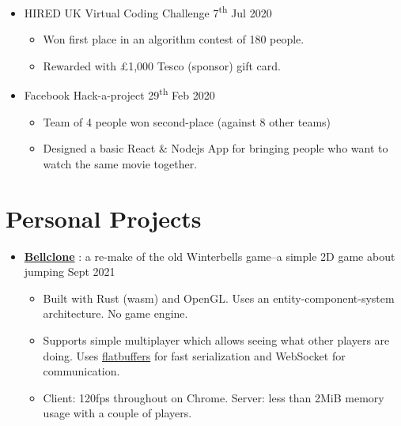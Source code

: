   \begin{itemize}
    \item HIRED \dashdiv{} UK Virtual Coding Challenge \dashdiv{} 7\textsuperscript{th} Jul 2020
    \begin{itemize}
      \item Won first place in an algorithm contest of 180 people.
      \item Rewarded with £1,000 Tesco (sponsor) gift card.
    \end{itemize}
    \item Facebook \dashdiv{} Hack-a-project \dashdiv{} 29\textsuperscript{th} Feb 2020
    \begin{itemize}
      \item Team of 4 people won second-place (against 8 other teams)
      \item Designed a basic React \& Nodejs App  for bringing people who want to watch the same movie together.
    \end{itemize}
  \end{itemize}

  \section{Personal Projects}

  \begin{itemize}

    \item \href{https://bellclone.maowtm.org/}{\color{link}\textbf{Bellclone}} : a re-make of the old Winterbells game--a simple 2D game about jumping \dashdiv{} Sept 2021

    \begin{itemize}
      \item Built with Rust (wasm) and OpenGL. Uses an entity-component-system architecture. No game engine.
      \item Supports simple multiplayer which allows seeing what other players are doing. Uses \href{https://google.github.io/flatbuffers/}{\color{link}flatbuffers} for fast serialization and WebSocket for communication.
      \item Client: 120fps throughout on Chrome. Server: less than 2MiB memory usage with a couple of players.
    \end{itemize}

  \end{itemize}


